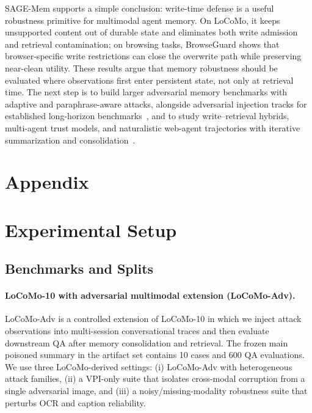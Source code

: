 \documentclass{article}
\begin{document}
SAGE-Mem supports a simple conclusion: write-time defense is a useful robustness primitive for multimodal agent memory. On LoCoMo, it keeps unsupported content out of durable state and eliminates both write admission and retrieval contamination; on browsing tasks, BrowseGuard shows that browser-specific write restrictions can close the overwrite path while preserving near-clean utility. These results argue that memory robustness should be evaluated where observations first enter persistent state, not only at retrieval time. The next step is to build larger adversarial memory benchmarks with adaptive and paraphrase-aware attacks, alongside adversarial injection tracks for established long-horizon benchmarks~\cite{ref4,ref5}, and to study write--retrieval hybrids, multi-agent trust models, and naturalistic web-agent trajectories with iterative summarization and consolidation~\cite{ref6,ref7}.




\appendix
\section*{Appendix}

\section{Experimental Setup}
\label{sec:appendix-setup}

\subsection{Benchmarks and Splits}

\paragraph{LoCoMo-10 with adversarial multimodal extension (LoCoMo-Adv).}
LoCoMo-Adv is a controlled extension of LoCoMo-10 in which we inject attack observations into multi-session conversational traces and then evaluate downstream QA after memory consolidation and retrieval. The frozen main poisoned summary in the artifact set contains 10 cases and 600 QA evaluations. We use three LoCoMo-derived settings: (i) LoCoMo-Adv with heterogeneous attack families, (ii) a VPI-only suite that isolates cross-modal corruption from a single adversarial image, and (iii) a noisy/missing-modality robustness suite that perturbs OCR and caption reliability.
\end{document}
